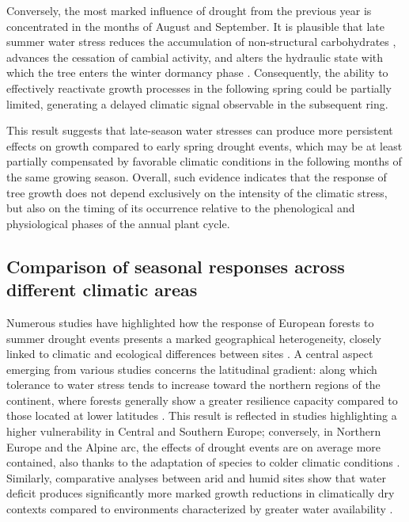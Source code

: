 \documentclass[12pt, a4paper]{article}
\begin{document}
Conversely, the most marked influence of drought from the previous year is concentrated in the months of August and September. It is plausible that late summer water stress reduces the accumulation of non-structural carbohydrates \parencite{sala2012, hartmann2013}, advances the cessation of cambial activity, and alters the hydraulic state with which the tree enters the winter dormancy phase \parencite{cuny2015}. Consequently, the ability to effectively reactivate growth processes in the following spring could be partially limited, generating a delayed climatic signal observable in the subsequent ring.

This result suggests that late-season water stresses can produce more persistent effects on growth compared to early spring drought events, which may be at least partially compensated by favorable climatic conditions in the following months of the same growing season. Overall, such evidence indicates that the response of tree growth does not depend exclusively on the intensity of the climatic stress, but also on the timing of its occurrence relative to the phenological and physiological phases of the annual plant cycle.


\subsection{Comparison of seasonal responses across different climatic areas}

Numerous studies have highlighted how the response of European forests to summer drought events presents a marked geographical heterogeneity, closely linked to climatic and ecological differences between sites \parencite{gharun2024}. A central aspect emerging from various studies concerns the latitudinal gradient: along which tolerance to water stress tends to increase toward the northern regions of the continent, where forests generally show a greater resilience capacity compared to those located at lower latitudes \parencite{beloiuschwenke2024}. This result is reflected in studies highlighting a higher vulnerability in Central and Southern Europe; conversely, in Northern Europe and the Alpine arc, the effects of drought events are on average more contained, also thanks to the adaptation of species to colder climatic conditions \parencite{knutzen2025}. Similarly, comparative analyses between arid and humid sites show that water deficit produces significantly more marked growth reductions in climatically dry contexts compared to environments characterized by greater water availability \parencite{gazol2020}.
\end{document}
